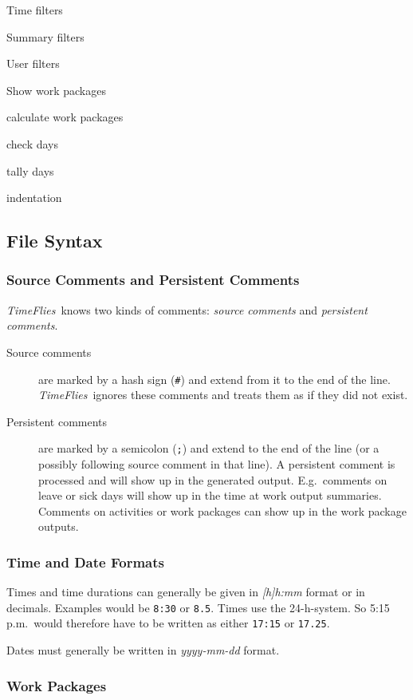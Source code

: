 \documentclass[11pt]{article}
\newcommand{\timeflies}{\emph{TimeFlies}}
\begin{document}
Time filters

Summary filters

User filters

Show work packages

calculate work packages

check days

tally days

indentation

\subsection{File Syntax}

\subsubsection{Source Comments and Persistent Comments}

\timeflies\ knows two kinds of comments: \emph{source comments} and \emph{persistent comments}.

\begin{description}
\item[Source comments] are marked by a hash sign (\verb:#:) and extend from it to the end of the line. \timeflies\ ignores these comments and treats them as if they did not exist.

\item[Persistent comments] are marked by a semicolon (\verb:;:) and extend to the end of the line (or a possibly following source comment in that line). A persistent comment is processed and will show up in the generated output. E.g.\ comments on leave or sick days will show up in the time at work output summaries. Comments on activities or work packages can show up in the work package outputs. 
\end{description}

\subsubsection{Time and Date Formats}

Times and time durations can generally be given in \emph{[h]h:mm} format or in decimals. Examples would be \verb-8:30- or \verb-8.5-. Times use the 24-h-system. So 5:15 p.m.\ would therefore have to be written as either \verb-17:15- or \verb-17.25-.

Dates must generally be written in \emph{yyyy-mm-dd} format.

\subsubsection{Work Packages}
\end{document}
